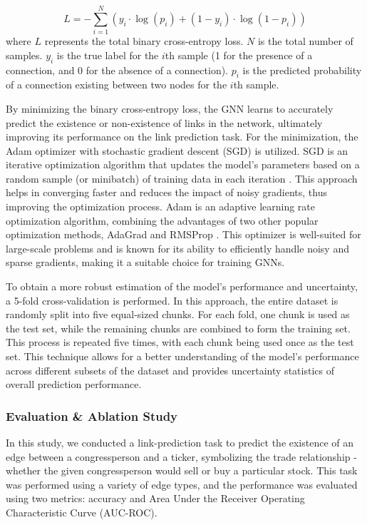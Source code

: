 \documentclass[15pt,letterpaper]{article}
\begin{document}
$$L=-\sum_{i=1}^N\left(y_i \cdot \log \left(p_i\right)+\left(1-y_i\right) \cdot \log \left(1-p_i\right)\right)$$
where $L$ represents the total binary cross-entropy loss.
$N$ is the total number of samples.
$y_i$ is the true label for the $i$th sample (1 for the presence of a connection, and 0 for the absence of a connection).
$p_i$ is the predicted probability of a connection existing between two nodes for the $i$th sample.

By minimizing the binary cross-entropy loss, the GNN learns to accurately predict the existence or non-existence of links in the network, ultimately improving its performance on the link prediction task.
For the minimization, the Adam optimizer \citep{kingma2014adam} with stochastic gradient descent (SGD) is utilized. SGD is an iterative optimization algorithm that updates the model's parameters based on a random sample (or minibatch) of training data in each iteration \citep{AMARI1993185}. This approach helps in converging faster and reduces the impact of noisy gradients, thus improving the optimization process. Adam is an adaptive learning rate optimization algorithm, combining the advantages of two other popular optimization methods, AdaGrad and RMSProp \citep{kingma2014adam}. This optimizer is well-suited for large-scale problems and is known for its ability to efficiently handle noisy and sparse gradients, making it a suitable choice for training GNNs.

To obtain a more robust estimation of the model's performance and uncertainty, a 5-fold cross-validation \citep{elem} is performed. In this approach, the entire dataset is randomly split into five equal-sized chunks. For each fold, one chunk is used as the test set, while the remaining chunks are combined to form the training set. This process is repeated five times, with each chunk being used once as the test set. This technique allows for a better understanding of the model's performance across different subsets of the dataset and provides uncertainty statistics of overall prediction performance.

\subsubsection{Evaluation \& Ablation Study}

In this study, we conducted a link-prediction \citep{lp} task to predict the existence of an edge between a congressperson and a ticker, symbolizing the trade relationship - whether the given congressperson would sell or buy a particular stock. This task was performed using a variety of edge types, and the performance was evaluated using two metrics: accuracy and Area Under the Receiver Operating Characteristic Curve (AUC-ROC).
\end{document}
